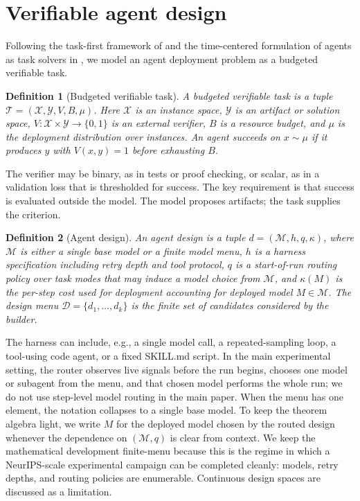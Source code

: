 \documentclass{article}
\newtheorem{definition}{Definition}
\newcommand{\cD}{\mathcal{D}}
\newcommand{\cT}{\mathcal{T}}
\newcommand{\cX}{\mathcal{X}}
\newcommand{\cY}{\mathcal{Y}}
\begin{document}
\section{Verifiable agent design}
\label{sec:setup}

Following the task-first framework of \citet{beneventano2026framework} and the time-centered formulation of agents as task solvers in \citet{achille2025agents}, we model an agent deployment problem as a budgeted verifiable task.

\begin{definition}[Budgeted verifiable task]
\label{def:task}
A budgeted verifiable task is a tuple
$\cT=(\cX,\cY,V,B,\mu)$.
Here $\cX$ is an instance space, $\cY$ is an artifact or solution space, $V:\cX\times\cY\to\{0,1\}$ is an external verifier, $B$ is a resource budget, and $\mu$ is the deployment distribution over instances.
An agent succeeds on $x\sim\mu$ if it produces $y$ with $V(x,y)=1$ before exhausting $B$.
\end{definition}

The verifier may be binary, as in tests or proof checking, or scalar, as in a validation loss that is thresholded for success.
The key requirement is that success is evaluated outside the model.
The model proposes artifacts; the task supplies the criterion.

\begin{definition}[Agent design]
\label{def:design}
An agent design is a tuple
$d=(\mathcal M,h,q,\kappa)$, where $\mathcal M$ is either a single base model or a finite model menu, $h$ is a harness specification including retry depth and tool protocol, $q$ is a start-of-run routing policy over task modes that may induce a model choice from $\mathcal M$, and $\kappa(M)$ is the per-step cost used for deployment accounting for deployed model $M\in\mathcal M$.
The design menu $\cD=\{d_1,\ldots,d_k\}$ is the finite set of candidates considered by the builder.
\end{definition}

The harness can include, e.g., a single model call, a repeated-sampling loop, a tool-using code agent, or a fixed SKILL.md script.
In the main experimental setting, the router observes live signals before the run begins, chooses one model or subagent from the menu, and that chosen model performs the whole run; we do not use step-level model routing in the main paper.
When the menu has one element, the notation collapses to a single base model.
To keep the theorem algebra light, we write $M$ for the deployed model chosen by the routed design whenever the dependence on $(\mathcal M,q)$ is clear from context.
We keep the mathematical development finite-menu because this is the regime in which a NeurIPS-scale experimental campaign can be completed cleanly: models, retry depths, and routing policies are enumerable.
Continuous design spaces are discussed as a limitation.
\end{document}
